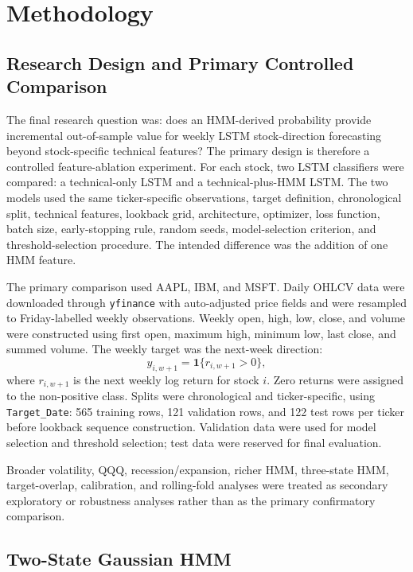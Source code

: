 \section{Methodology}

\subsection{Research Design and Primary Controlled Comparison}

The final research question was: does an HMM-derived probability provide incremental out-of-sample value for weekly LSTM stock-direction forecasting beyond stock-specific technical features? The primary design is therefore a controlled feature-ablation experiment. For each stock, two LSTM classifiers were compared: a technical-only LSTM and a technical-plus-HMM LSTM. The two models used the same ticker-specific observations, target definition, chronological split, technical features, lookback grid, architecture, optimizer, loss function, batch size, early-stopping rule, random seeds, model-selection criterion, and threshold-selection procedure. The intended difference was the addition of one HMM feature.

The primary comparison used AAPL, IBM, and MSFT. Daily OHLCV data were downloaded through \texttt{yfinance} with auto-adjusted price fields and were resampled to Friday-labelled weekly observations. Weekly open, high, low, close, and volume were constructed using first open, maximum high, minimum low, last close, and summed volume. The weekly target was the next-week direction:
\[
y_{i,w+1}=\mathbf{1}\{r_{i,w+1}>0\},
\]
where \(r_{i,w+1}\) is the next weekly log return for stock \(i\). Zero returns were assigned to the non-positive class. Splits were chronological and ticker-specific, using \texttt{Target\_Date}: 565 training rows, 121 validation rows, and 122 test rows per ticker before lookback sequence construction. Validation data were used for model selection and threshold selection; test data were reserved for final evaluation.

Broader volatility, QQQ, recession/expansion, richer HMM, three-state HMM, target-overlap, calibration, and rolling-fold analyses were treated as secondary exploratory or robustness analyses rather than as the primary confirmatory comparison.

\subsection{Two-State Gaussian HMM}

